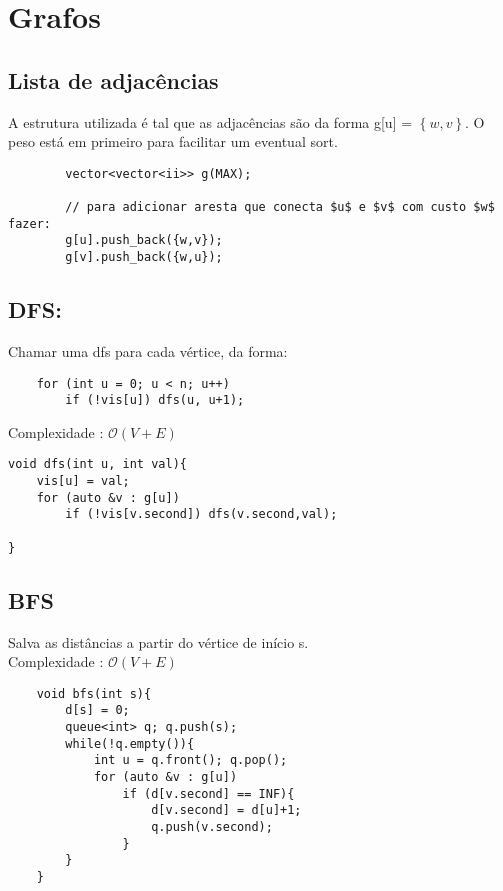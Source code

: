 \section{Grafos}

\subsection{Lista de adjacências} 

\par A estrutura utilizada é tal que as adjacências são da forma 
g[u] = $\left\{w,v\right\}$. 
O peso está em primeiro para facilitar um eventual sort.

\begin{verbatim}
        vector<vector<ii>> g(MAX);

        // para adicionar aresta que conecta $u$ e $v$ com custo $w$ fazer:
        g[u].push_back({w,v}); 
        g[v].push_back({w,u}); 
    \end{verbatim}

\subsection{DFS:}
\par Chamar uma dfs para cada vértice, da forma:
\begin{verbatim}
    for (int u = 0; u < n; u++) 
        if (!vis[u]) dfs(u, u+1);
\end{verbatim}
Complexidade : $\mathcal{O}(V+E)$
    \begin{verbatim}
void dfs(int u, int val){
    vis[u] = val;
    for (auto &v : g[u])
        if (!vis[v.second]) dfs(v.second,val);
    
}
    \end{verbatim}

\subsection{BFS}
\par Salva as distâncias a partir do vértice de início s.\\
Complexidade : $\mathcal{O}(V+E)$
\begin{verbatim}
    void bfs(int s){
        d[s] = 0;
        queue<int> q; q.push(s);
        while(!q.empty()){
            int u = q.front(); q.pop();
            for (auto &v : g[u])
                if (d[v.second] == INF){
                    d[v.second] = d[u]+1;
                    q.push(v.second);
                }
        }
    }
    
\end{verbatim}

